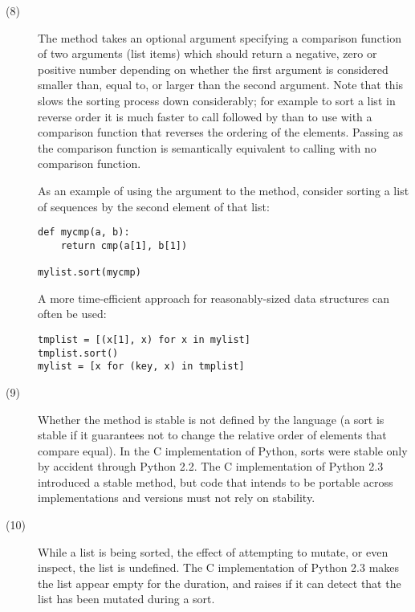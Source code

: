 \begin{description}
\item[(8)] The  method takes an optional argument
  specifying a comparison function of two arguments (list items) which
  should return a negative, zero or positive number depending on whether
  the first argument is considered smaller than, equal to, or larger
  than the second argument.  Note that this slows the sorting process
  down considerably; for example to sort a list in reverse order it is much
  faster to call  followed by 
  than to use  with a comparison function that
  reverses the ordering of the elements.  Passing  as the
  comparison function is semantically equivalent to calling
   with no comparison function.

  As an example of using the  argument to the
   method, consider sorting a list of sequences by the
  second element of that list:

\begin{verbatim}
def mycmp(a, b):
    return cmp(a[1], b[1])

mylist.sort(mycmp)
\end{verbatim}

  A more time-efficient approach for reasonably-sized data structures can
  often be used:

\begin{verbatim}
tmplist = [(x[1], x) for x in mylist]
tmplist.sort()
mylist = [x for (key, x) in tmplist]
\end{verbatim}

\item[(9)] Whether the  method is stable is not defined by
  the language (a sort is stable if it guarantees not to change the
  relative order of elements that compare equal).  In the C
  implementation of Python, sorts were stable only by accident through
  Python 2.2.  The C implementation of Python 2.3 introduced a stable
   method, but code that intends to be portable across
  implementations and versions must not rely on stability.

\item[(10)] While a list is being sorted, the effect of attempting to
  mutate, or even inspect, the list is undefined.  The C implementation
  of Python 2.3 makes the list appear empty for the duration, and raises
   if it can detect that the list has been
  mutated during a sort.
\end{description}



